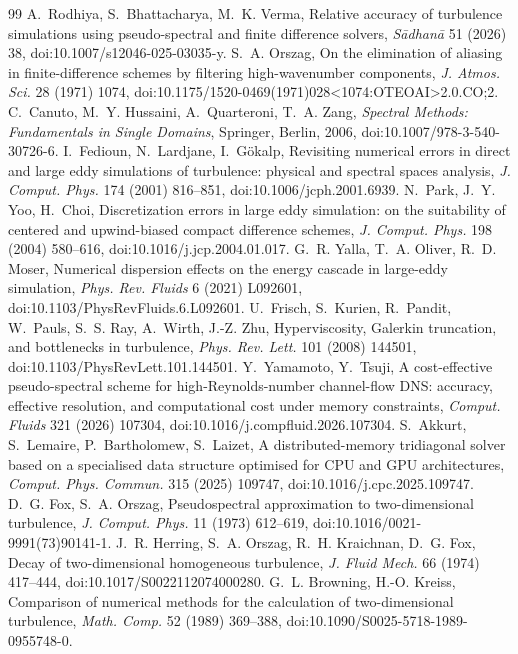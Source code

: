 \documentclass[11pt,a4paper]{article}
\begin{document}
\begin{thebibliography}{99}
A.~Rodhiya, S.~Bhattacharya, M.~K. Verma, Relative accuracy of turbulence simulations using pseudo-spectral and finite difference solvers, \emph{S\=adhan\=a} 51 (2026) 38, doi:10.1007/s12046-025-03035-y.
S.~A. Orszag, On the elimination of aliasing in finite-difference schemes by filtering high-wavenumber components, \emph{J. Atmos. Sci.} 28 (1971) 1074, doi:10.1175/1520-0469(1971)028<1074:OTEOAI>2.0.CO;2.
C.~Canuto, M.~Y. Hussaini, A.~Quarteroni, T.~A. Zang, \emph{Spectral Methods: Fundamentals in Single Domains}, Springer, Berlin, 2006, doi:10.1007/978-3-540-30726-6.
I.~Fedioun, N.~Lardjane, I.~G\"okalp, Revisiting numerical errors in direct and large eddy simulations of turbulence: physical and spectral spaces analysis, \emph{J. Comput. Phys.} 174 (2001) 816--851, doi:10.1006/jcph.2001.6939.
N.~Park, J.~Y. Yoo, H.~Choi, Discretization errors in large eddy simulation: on the suitability of centered and upwind-biased compact difference schemes, \emph{J. Comput. Phys.} 198 (2004) 580--616, doi:10.1016/j.jcp.2004.01.017.
G.~R. Yalla, T.~A. Oliver, R.~D. Moser, Numerical dispersion effects on the energy cascade in large-eddy simulation, \emph{Phys. Rev. Fluids} 6 (2021) L092601, doi:10.1103/PhysRevFluids.6.L092601.
U.~Frisch, S.~Kurien, R.~Pandit, W.~Pauls, S.~S. Ray, A.~Wirth, J.-Z. Zhu, Hyperviscosity, Galerkin truncation, and bottlenecks in turbulence, \emph{Phys. Rev. Lett.} 101 (2008) 144501, doi:10.1103/PhysRevLett.101.144501.
Y.~Yamamoto, Y.~Tsuji, A cost-effective pseudo-spectral scheme for high-Reynolds-number channel-flow DNS: accuracy, effective resolution, and computational cost under memory constraints, \emph{Comput. Fluids} 321 (2026) 107304, doi:10.1016/j.compfluid.2026.107304.
S.~Akkurt, S.~Lemaire, P.~Bartholomew, S.~Laizet, A distributed-memory tridiagonal solver based on a specialised data structure optimised for CPU and GPU architectures, \emph{Comput. Phys. Commun.} 315 (2025) 109747, doi:10.1016/j.cpc.2025.109747.
D.~G. Fox, S.~A. Orszag, Pseudospectral approximation to two-dimensional turbulence, \emph{J. Comput. Phys.} 11 (1973) 612--619, doi:10.1016/0021-9991(73)90141-1.
J.~R. Herring, S.~A. Orszag, R.~H. Kraichnan, D.~G. Fox, Decay of two-dimensional homogeneous turbulence, \emph{J. Fluid Mech.} 66 (1974) 417--444, doi:10.1017/S0022112074000280.
G.~L. Browning, H.-O. Kreiss, Comparison of numerical methods for the calculation of two-dimensional turbulence, \emph{Math. Comp.} 52 (1989) 369--388, doi:10.1090/S0025-5718-1989-0955748-0.

\end{thebibliography}
\end{document}
